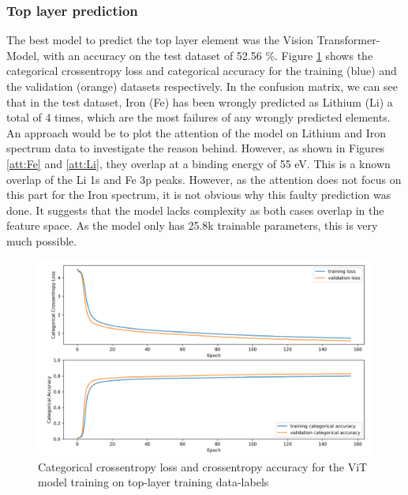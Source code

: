 \subsubsection{Top layer prediction}
The best model to predict the top layer element was the Vision Transformer-Model, with an accuracy on the test dataset of 52.56 \%. Figure \ref{fig:top_best_loss} shows the categorical crossentropy loss and categorical accuracy for the training (blue) and the validation (orange) datasets respectively. In the confusion matrix, we can see that in the test dataset, Iron (Fe) has been wrongly predicted as Lithium (Li) a total of 4 times, which are the most failures of any wrongly predicted elements. An approach would be to plot the attention of the model on Lithium and Iron spectrum data to investigate the reason behind. However, as shown in Figures \ref{att:Fe} and \ref{att:Li}, they overlap at a binding energy of 55 eV. This is a known overlap of the Li 1s and Fe 3p peaks. However, as the attention does not focus on this part for the Iron spectrum, it is not obvious why this faulty prediction was done. It suggests that the model lacks complexity as both cases overlap in the feature space. As the model only has 25.8k trainable parameters, this is very much possible. 


\begin{figure}[H]
    \centering
    \includegraphics[width=\textwidth]{Figures/best_task_1_model_loss.png}
    \caption{Categorical crossentropy loss and crossentropy accuracy for the ViT model training on top-layer training data-labels}
    \label{fig:top_best_loss}
\end{figure}

